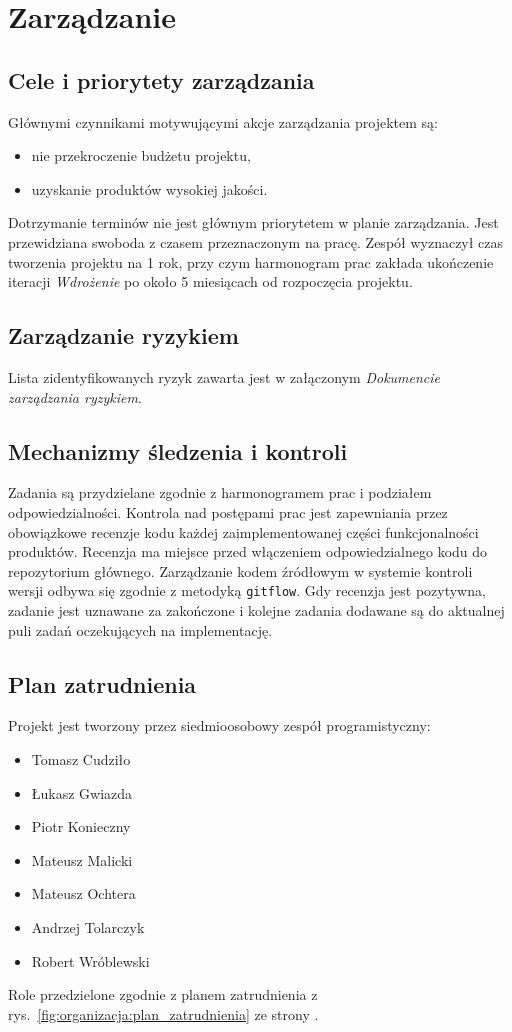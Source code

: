 \newpage
\section{Zarządzanie}

\subsection{Cele i priorytety zarządzania}
Głównymi czynnikami motywującymi akcje zarządzania projektem są:
\begin{itemize}[nosep]
    \item nie przekroczenie budżetu projektu,
    \item uzyskanie produktów wysokiej jakości.
\end{itemize}
Dotrzymanie terminów nie jest głównym priorytetem w planie zarządzania. Jest
przewidziana swoboda z czasem przeznaczonym na pracę. Zespół wyznaczył czas
tworzenia projektu na 1 rok, przy czym harmonogram prac zakłada ukończenie
iteracji \emph{Wdrożenie} po około 5 miesiącach od rozpoczęcia projektu.

\subsection{Zarządzanie ryzykiem}
Lista zidentyfikowanych ryzyk zawarta jest w załączonym \emph{Dokumencie
zarządzania ryzykiem}.

\subsection{Mechanizmy śledzenia i kontroli}
Zadania są przydzielane zgodnie z harmonogramem prac i podziałem
odpowiedzialności. Kontrola nad postępami prac jest zapewniania przez
obowiązkowe recenzje kodu każdej zaimplementowanej części funkcjonalności
produktów. Recenzja ma miejsce przed włączeniem odpowiedzialnego kodu do
repozytorium głównego. Zarządzanie kodem źródłowym w systemie kontroli wersji
odbywa się zgodnie z metodyką \texttt{git\dywiz flow}. Gdy recenzja jest
pozytywna, zadanie jest uznawane za zakończone i kolejne zadania dodawane są do
aktualnej puli zadań oczekujących na implementację.

\subsection{Plan zatrudnienia}
Projekt jest tworzony przez siedmioosobowy zespół programistyczny:
\begin{itemize}[nosep]
    \item Tomasz Cudziło
    \item Łukasz Gwiazda
    \item Piotr Konieczny
    \item Mateusz Malicki
    \item Mateusz Ochtera
    \item Andrzej Tolarczyk
    \item Robert Wróblewski
\end{itemize}
Role przedzielone zgodnie z planem zatrudnienia z
rys.~\ref{fig:organizacja:plan_zatrudnienia} ze strony
\pageref{fig:organizacja:plan_zatrudnienia}.

